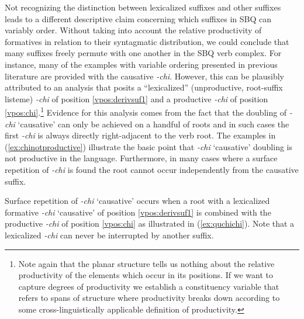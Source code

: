 \documentclass[output=paper]{langscibook}
\begin{document}
Not recognizing the distinction between lexicalized suffixes and other suffixes leads to a different descriptive claim concerning which suffixes in SBQ can variably order. Without taking into account the relative productivity of formatives in relation to their syntagmatic distribution, we could conclude that many suffixes freely permute with one another in the SBQ verb complex. For instance, many of the examples with variable ordering presented in previous literature are provided with the causative \textit{-chi}. However, this can be plausibly attributed to an analysis that posits a ``lexicalized'' (unproductive, root-suffix listeme) \textit{-chi} of position \ref{vpos:derivsuf1} and a productive \textit{-chi} of position \ref{vpos:chi}.\footnote{Note again that the planar structure tells us nothing about the relative productivity of the elements which occur in its positions. If we want to capture degrees of productivity we establish a constituency variable that refers to spans of structure where productivity breaks down according to some cross-linguistically applicable definition of productivity.} Evidence for this analysis comes from the fact that the doubling of \textit{-chi} `causative' can only be achieved on a handful of roots and in such cases the first \textit{-chi} is always directly right-adjacent to the verb root. The examples in (\ref{ex:chinotproductive}) illustrate the basic point that \textit{-chi} `causative' doubling is not productive in the language. Furthermore, in many cases where a surface repetition of \textit{-chi} is found the root cannot occur independently from the causative suffix.

\ea \label{ex:chinotproductive}
    \z
\z

Surface repetition of \textit{-chi} `causative' occurs when a root with a lexicalized formative \textit{-chi} `causative' of position \ref{vpos:derivsuf1} is combined with the productive \textit{-chi} of position \ref{vpos:chi} as illustrated in (\ref{ex:quchichi}). Note that a lexicalized \textit{-chi} can never be interrupted by another suffix.
\end{document}
